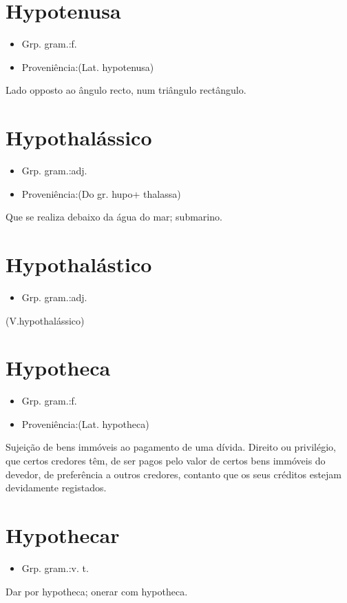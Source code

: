 \documentclass{article}
\begin{document}
\section{Hypotenusa}
\begin{itemize}
\item {Grp. gram.:f.}
\end{itemize}
\begin{itemize}
\item {Proveniência:(Lat. \textunderscore hypotenusa\textunderscore )}
\end{itemize}
Lado opposto ao ângulo recto, num triângulo rectângulo.
\section{Hypothalássico}
\begin{itemize}
\item {Grp. gram.:adj.}
\end{itemize}
\begin{itemize}
\item {Proveniência:(Do gr. \textunderscore hupo\textunderscore  + \textunderscore thalassa\textunderscore )}
\end{itemize}
Que se realiza debaixo da água do mar; submarino.
\section{Hypothalástico}
\begin{itemize}
\item {Grp. gram.:adj.}
\end{itemize}
(V.hypothalássico)
\section{Hypotheca}
\begin{itemize}
\item {Grp. gram.:f.}
\end{itemize}
\begin{itemize}
\item {Proveniência:(Lat. \textunderscore hypotheca\textunderscore )}
\end{itemize}
Sujeição de bens immóveis ao pagamento de uma dívida.
Direito ou privilégio, que certos credores têm, de ser pagos pelo valor de certos bens immóveis do devedor, de preferência a outros credores, contanto que os seus créditos estejam devidamente registados.
\section{Hypothecar}
\begin{itemize}
\item {Grp. gram.:v. t.}
\end{itemize}
Dar por hypotheca; onerar com hypotheca.
\end{document}
